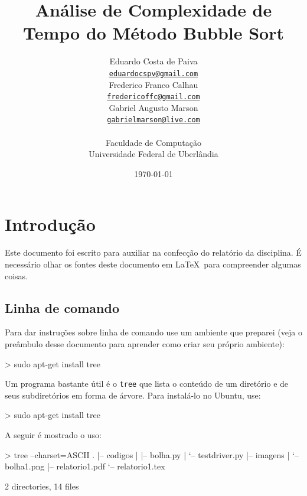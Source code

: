 \documentclass[12pt,a4paper,twoside]{report}
\title{Análise de Complexidade de Tempo do Método Bubble Sort}
\date{}
\author{Eduardo Costa de Paiva \\
\texttt{\small \url{eduardocspv@gmail.com}}\\
Frederico Franco Calhau \\
\texttt{\small \url{fredericoffc@gmail.com}}\\
Gabriel Augusto Marson \\
\texttt{\small \url{gabrielmarson@live.com}}\\
\vspace{1cm} \\
Faculdade de Computação \\
Universidade Federal de Uberlândia
}
\date{\today}
\begin{document}
  \maketitle
\listoffigures            
\listoftables            
\lstlistoflistings

\tableofcontents    


\fancyhead[RE,LO]{\thesection}

\setlength{\parskip}{0.15in} %

\chapter{Introdução}
Este documento foi escrito para auxiliar na confecção do relatório da
disciplina. É necessário olhar os fontes deste documento em \LaTeX\ para
compreender algumas coisas.

\section{Linha de comando}
Para dar instruções sobre linha de comando use um ambiente que preparei
(veja o preâmbulo desse documento para aprender como criar seu próprio
ambiente):

\begin{latex}
\begin{terminal}
> sudo apt-get install tree
\end{terminal}
\end{latex}

Um programa bastante útil é o \verb|tree| que lista o conteúdo de um
diretório e de seus subdiretórios em forma de árvore. Para instalá-lo no
Ubuntu, use:

\begin{terminal}
> sudo apt-get install tree
\end{terminal}

A seguir é mostrado o uso:
\begin{terminal}
> tree --charset=ASCII
.
|-- codigos
|   |-- bolha.py
|   `-- testdriver.py
|-- imagens
|   `-- bolha1.png
|-- relatorio1.pdf
`-- relatorio1.tex

2 directories, 14 files
\end{terminal}
\end{document}
